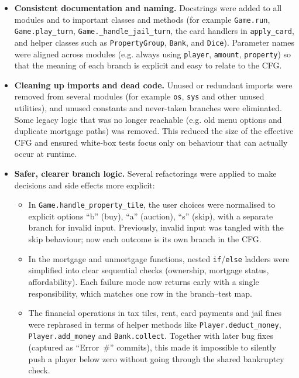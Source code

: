 \documentclass[11pt]{article}
\begin{document}
\begin{itemize}
  \item \textbf{Consistent documentation and naming.}  Docstrings were added to all modules and to important classes and methods (for example \texttt{Game.run}, \texttt{Game.play\_turn}, \texttt{Game.\_handle\_jail\_turn}, the card handlers in \texttt{apply\_card}, and helper classes such as \texttt{PropertyGroup}, \texttt{Bank}, and \texttt{Dice}).  Parameter names were aligned across modules (e.g. always using \texttt{player}, \texttt{amount}, \texttt{property}) so that the meaning of each branch is explicit and easy to relate to the CFG.

  \item \textbf{Cleaning up imports and dead code.}  Unused or redundant imports were removed from several modules (for example \texttt{os}, \texttt{sys} and other unused utilities), and unused constants and never-taken branches were eliminated.  Some legacy logic that was no longer reachable (e.g. old menu options and duplicate mortgage paths) was removed.  This reduced the size of the effective CFG and ensured white-box tests focus only on behaviour that can actually occur at runtime.

  \item \textbf{Safer, clearer branch logic.}  Several refactorings were applied to make decisions and side effects more explicit:
  \begin{itemize}
    \item In \texttt{Game.handle\_property\_tile}, the user choices were normalised to explicit options ``b'' (buy), ``a'' (auction), ``s'' (skip), with a separate branch for invalid input.  Previously, invalid input was tangled with the skip behaviour; now each outcome is its own branch in the CFG.
    \item In the mortgage and unmortgage functions, nested \texttt{if}/\texttt{else} ladders were simplified into clear sequential checks (ownership, mortgage status, affordability).  Each failure mode now returns early with a single responsibility, which matches one row in the branch--test map.
    \item The financial operations in tax tiles, rent, card payments and jail fines were rephrased in terms of helper methods like \texttt{Player.deduct\_money}, \texttt{Player.add\_money} and \texttt{Bank.collect}.  Together with later bug fixes (captured as ``Error~\#'' commits), this made it impossible to silently push a player below zero without going through the shared bankruptcy check.
  \end{itemize}


\end{itemize}
\end{document}

